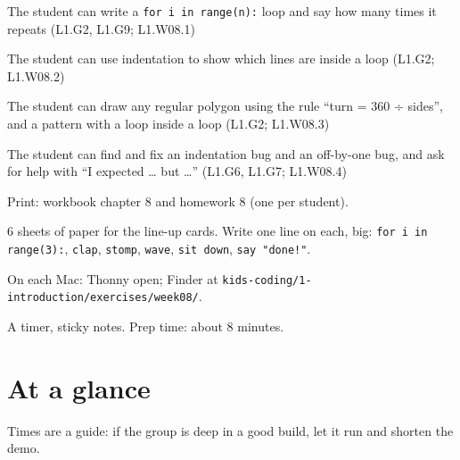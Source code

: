 
\begin{objectives}
  \item The student can write a \texttt{for i in range(n):} loop and say how many times it repeats (L1.G2, L1.G9; L1.W08.1)
  \item The student can use indentation to show which lines are inside a loop (L1.G2; L1.W08.2)
  \item The student can draw any regular polygon using the rule \enquote{turn = 360 ÷ sides}, and a pattern with a loop inside a loop (L1.G2; L1.W08.3)
  \item The student can find and fix an indentation bug and an off-by-one bug, and ask for help with \enquote{I expected … but …} (L1.G6, L1.G7; L1.W08.4)
\end{objectives}

\begin{materials}
  \item Print: workbook chapter 8 and homework 8 (one per student).
  \item 6 sheets of paper for the line-up cards. Write one line on each, big: \texttt{for i in range(3):}, \texttt{clap}, \texttt{stomp}, \texttt{wave}, \texttt{sit down}, \texttt{say "done!"}.
  \item On each Mac: Thonny open; Finder at \texttt{kids-coding/1-introduction/exercises/week08/}.
  \item A timer, sticky notes. Prep time: about 8 minutes.
\end{materials}

\section{At a glance}
Times are a guide: if the group is deep in a good build, let it run and shorten the demo.
\begin{timeplan}
\end{timeplan}

